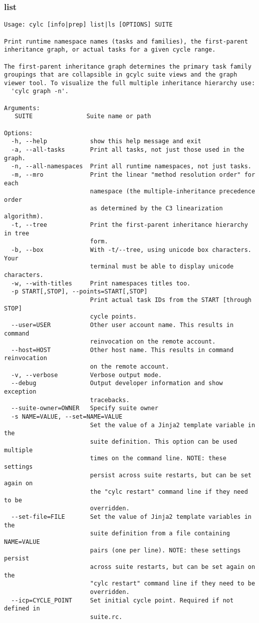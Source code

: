 \subsubsection{list}
\label{list}
\begin{lstlisting}
Usage: cylc [info|prep] list|ls [OPTIONS] SUITE 

Print runtime namespace names (tasks and families), the first-parent
inheritance graph, or actual tasks for a given cycle range.

The first-parent inheritance graph determines the primary task family
groupings that are collapsible in gcylc suite views and the graph
viewer tool. To visualize the full multiple inheritance hierarchy use:
  'cylc graph -n'.

Arguments:
   SUITE               Suite name or path

Options:
  -h, --help            show this help message and exit
  -a, --all-tasks       Print all tasks, not just those used in the graph.
  -n, --all-namespaces  Print all runtime namespaces, not just tasks.
  -m, --mro             Print the linear "method resolution order" for each
                        namespace (the multiple-inheritance precedence order
                        as determined by the C3 linearization algorithm).
  -t, --tree            Print the first-parent inheritance hierarchy in tree
                        form.
  -b, --box             With -t/--tree, using unicode box characters. Your
                        terminal must be able to display unicode characters.
  -w, --with-titles     Print namespaces titles too.
  -p START[,STOP], --points=START[,STOP]
                        Print actual task IDs from the START [through STOP]
                        cycle points.
  --user=USER           Other user account name. This results in command
                        reinvocation on the remote account.
  --host=HOST           Other host name. This results in command reinvocation
                        on the remote account.
  -v, --verbose         Verbose output mode.
  --debug               Output developer information and show exception
                        tracebacks.
  --suite-owner=OWNER   Specify suite owner
  -s NAME=VALUE, --set=NAME=VALUE
                        Set the value of a Jinja2 template variable in the
                        suite definition. This option can be used multiple
                        times on the command line. NOTE: these settings
                        persist across suite restarts, but can be set again on
                        the "cylc restart" command line if they need to be
                        overridden.
  --set-file=FILE       Set the value of Jinja2 template variables in the
                        suite definition from a file containing NAME=VALUE
                        pairs (one per line). NOTE: these settings persist
                        across suite restarts, but can be set again on the
                        "cylc restart" command line if they need to be
                        overridden.
  --icp=CYCLE_POINT     Set initial cycle point. Required if not defined in
                        suite.rc.
\end{lstlisting}
